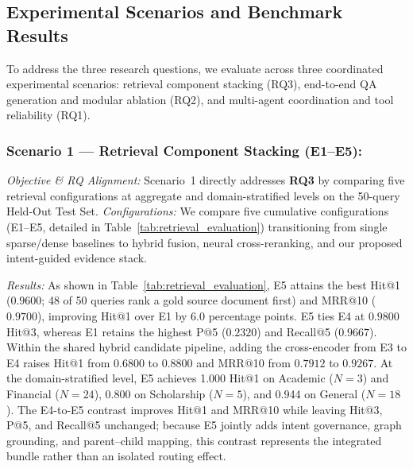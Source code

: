 \subsection{Experimental Scenarios and Benchmark Results}
\label{sec:scenarios}

To address the three research questions, we evaluate \system{} across three coordinated experimental scenarios: retrieval component stacking (RQ3), end-to-end QA generation and modular ablation (RQ2), and multi-agent coordination and tool reliability (RQ1).

\subsubsection{Scenario 1 --- Retrieval Component Stacking (E1--E5):}
\emph{Objective \& RQ Alignment:} Scenario~1 directly addresses \textbf{RQ3} by comparing five retrieval configurations at aggregate and domain-stratified levels on the 50-query Held-Out Test Set.
\emph{Configurations:} We compare five cumulative configurations (E1--E5, detailed in Table~\ref{tab:retrieval_evaluation}) transitioning from single sparse/dense baselines to hybrid fusion, neural cross-reranking, and our proposed intent-guided evidence stack.

\emph{Results:} As shown in Table~\ref{tab:retrieval_evaluation}, E5 attains the best Hit@1 ($0.9600$; 48 of 50 queries rank a gold source document first) and MRR@10 ($0.9700$), improving Hit@1 over E1 by 6.0 percentage points. E5 ties E4 at $0.9800$ Hit@3, whereas E1 retains the highest P@5 ($0.2320$) and Recall@5 ($0.9667$). Within the shared hybrid candidate pipeline, adding the cross-encoder from E3 to E4 raises Hit@1 from $0.6800$ to $0.8800$ and MRR@10 from $0.7912$ to $0.9267$. At the domain-stratified level, E5 achieves 1.000 Hit@1 on Academic ($N=3$) and Financial ($N=24$), 0.800 on Scholarship ($N=5$), and 0.944 on General ($N=18$). The E4-to-E5 contrast improves Hit@1 and MRR@10 while leaving Hit@3, P@5, and Recall@5 unchanged; because E5 jointly adds intent governance, graph grounding, and parent--child mapping, this contrast represents the integrated bundle rather than an isolated routing effect.

